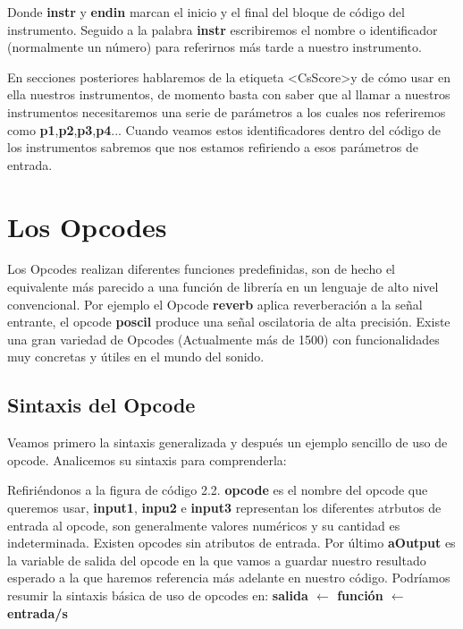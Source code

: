 
Donde \textbf{instr} y \textbf{endin} marcan el inicio y el final del bloque de código del instrumento. Seguido a la palabra \textbf{instr} escribiremos el nombre o identificador (normalmente un número) para referirnos más tarde a nuestro instrumento.

En secciones posteriores hablaremos de la etiqueta \textless CsScore\textgreater y de cómo usar en ella nuestros instrumentos, de momento basta con saber que al llamar a nuestros instrumentos necesitaremos una serie de parámetros a los cuales nos referiremos como \textbf{p1},\textbf{p2},\textbf{p3},\textbf{p4}... Cuando veamos estos identificadores dentro del código de los instrumentos sabremos que nos estamos refiriendo a esos parámetros de entrada.
 

\section{Los Opcodes}\label{sec:Opcodes}

Los Opcodes realizan diferentes funciones predefinidas, son de hecho el equivalente más parecido a una función de librería en un lenguaje de alto nivel convencional. Por ejemplo el Opcode \textbf{reverb} aplica reverberación a la señal entrante, el opcode \textbf{poscil} produce una señal oscilatoria de alta precisión. Existe una gran variedad de Opcodes (Actualmente más de 1500) con funcionalidades muy concretas y útiles en el mundo del sonido.

\subsection{Sintaxis del Opcode}\label{sec:SyntaxOpcodes}

Veamos primero la sintaxis generalizada y después un ejemplo sencillo de uso de opcode. Analicemos su sintaxis para comprenderla:


Refiriéndonos a la figura de código 2.2. \textbf{opcode} es el nombre del opcode que queremos usar, \textbf{input1}, \textbf{inpu2} e \textbf{input3} representan los diferentes atrbutos de entrada al opcode, son generalmente valores numéricos y su cantidad es indeterminada. Existen opcodes sin atributos de entrada. Por último \textbf{aOutput} es la variable de salida del opcode en la que vamos a guardar nuestro resultado esperado a la que haremos referencia más adelante en nuestro código.
Podríamos resumir la sintaxis básica de uso de opcodes en: \textbf{salida $\leftarrow$ función $\leftarrow$ entrada/s} 

